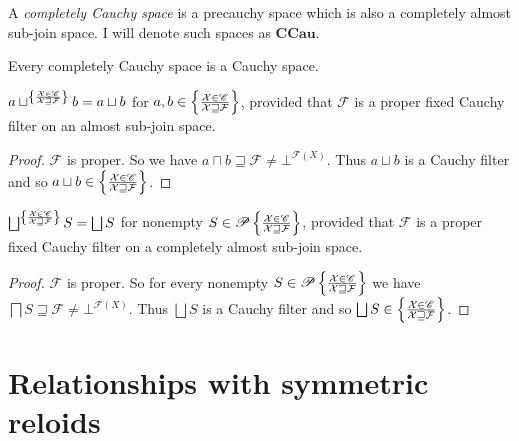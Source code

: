 \begin{defn}
  A \emph{completely Cauchy space} is a precauchy space which is also a completely almost sub-join space.
I will denote such spaces as $\mathbf{CCau}$.
\end{defn}

\begin{obvious}
Every completely Cauchy space is a Cauchy space.
\end{obvious}

\begin{prop}
  $a\sqcup^{
    \left\{ \frac{\mathcal{X} \in \mathscr{C} }{\mathcal{X} \sqsupseteq \mathcal{F}}\right\}
  } b = a\sqcup b$ for
  $a,b \in \left\{ \frac{\mathcal{X} \in \mathscr{C} }{\mathcal{X} \sqsupseteq \mathcal{F}}\right\}$,
  provided that $\mathcal{F}$ is a proper fixed Cauchy filter on an almost sub-join space.
\end{prop}

\begin{proof}
  $\mathcal{F}$ is proper. So
  we have $a \sqcap b \sqsupseteq \mathcal{F} \neq \bot^{\mathscr{F} (X)}$. Thus $a\sqcup b$ is a Cauchy
  filter and so $a\sqcup b \in \left\{ \frac{\mathcal{X} \in \mathscr{C} }{\mathcal{X} \sqsupseteq \mathcal{F}}\right\}$.
\end{proof}

\begin{prop}
  $\bigsqcup^{
    \setcond{\mathcal{X} \in \mathscr{C} }{\mathcal{X} \sqsupseteq \mathcal{F}}
  } S = \bigsqcup S$ for nonempty
  $S \in \mathscr{P} \left\{ \frac{\mathcal{X} \in \mathscr{C} }{\mathcal{X} \sqsupseteq \mathcal{F}}\right\}$,
  provided that $\mathcal{F}$ is a proper fixed Cauchy filter on a  completely almost sub-join space.
\end{prop}

\begin{proof}
  $\mathcal{F}$ is proper. So for every nonempty $S \in \mathscr{P}
  \left\{ \frac{\mathcal{X} \in \mathscr{C} }{\mathcal{X} \sqsupseteq \mathcal{F}}\right\}$
  we have $\bigsqcap S \sqsupseteq \mathcal{F} \neq \bot^{\mathscr{F} (X)}$. Thus $\bigsqcup S$ is a Cauchy
  filter and so $\bigsqcup S \in \setcond{\mathcal{X} \in \mathscr{C} }{\mathcal{X} \sqsupseteq \mathcal{F}}$.
\end{proof}

\section{Relationships with symmetric reloids}


